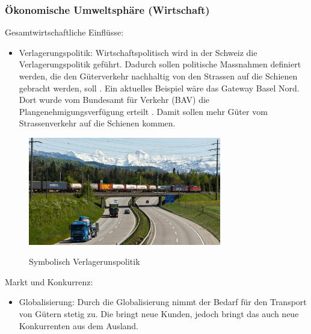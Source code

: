 \documentclass{article}
\begin{document}
\subsubsection{Ökonomische Umweltsphäre (Wirtschaft)}
Gesamtwirtschaftliche Einflüsse:
\begin{itemize}
    \item Verlagerungspolitik:
    Wirtschaftspolitisch wird in der Schweiz die Verlagerungspolitik geführt.
    Dadurch sollen politische Massnahmen definiert werden, die den Güterverkehr nachhaltig von den Strassen auf die Schienen gebracht werden, soll \parencite[o. S.]{verlagerungspolitik}.
    Ein aktuelles Beispiel wäre das Gateway Basel Nord.
    Dort wurde vom Bundesamt für Verkehr (BAV) die Plangenehmigungsverfügung erteilt \parencite[o. S.]{gatewayBasel}.
    Damit sollen mehr Güter vom Strassenverkehr auf die Schienen kommen.
\end{itemize}
\begin{figure}[htbp] %
    \centering
    \includegraphics[width=0.75\textwidth]{Verlagerungspolitik} %
    \caption{Symbolisch Verlagerunspolitik}\parencite[o. S.]{verlagerungspolitikBild}
    \label{fig:bildlabel3}
\end{figure}
Markt und Konkurrenz:
\begin{itemize}
    \item Globalisierung:
    Durch die Globalisierung nimmt der Bedarf für den Transport von Gütern stetig zu.
    Die bringt neue Kunden, jedoch bringt das auch neue Konkurrenten aus dem Ausland. 
\end{itemize}
\end{document}
